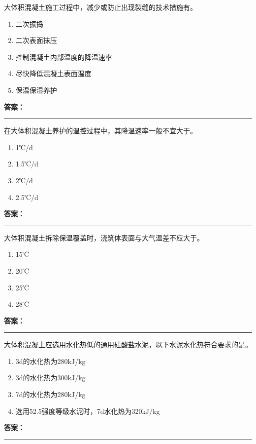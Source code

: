 \documentclass[UTF8,fontset=fandol,11pt]{ctexart}
\newcommand{\answerline}{\textcolor{answerred}{\rule{2.4cm}{0.7pt}}}
\begin{document}
\vspace{0.2em}

\begin{quizbox}[title={第 82 题}]
大体积混凝土施工过程中，减少或防止出现裂缝的技术措施有。\\
\begin{enumerate}[label=\Alph*.]
\item 二次振捣
\item 二次表面抹压
\item 控制混凝土内部温度的降温速率
\item 尽快降低混凝土表面温度
\item 保温保湿养护
\end{enumerate}
\textbf{\textcolor{answerred}{答案：}} \answerline
\end{quizbox}

\vspace{0.2em}

\begin{quizbox}[title={第 83 题}]
在大体积混凝土养护的温控过程中，其降温速率一般不宜大于。\\
\begin{enumerate}[label=\Alph*.]
\item 1℃/d
\item 1.5℃/d
\item 2℃/d
\item 2.5℃/d
\end{enumerate}
\textbf{\textcolor{answerred}{答案：}} \answerline
\end{quizbox}

\vspace{0.2em}

\begin{quizbox}[title={第 84 题}]
大体积混凝土拆除保温覆盖时，浇筑体表面与大气温差不应大于。\\
\begin{enumerate}[label=\Alph*.]
\item 15℃
\item 20℃
\item 25℃
\item 28℃
\end{enumerate}
\textbf{\textcolor{answerred}{答案：}} \answerline
\end{quizbox}

\vspace{0.2em}

\begin{quizbox}[title={第 85 题}]
大体积混凝土应选用水化热低的通用硅酸盐水泥，以下水泥水化热符合要求的是。\\
\begin{enumerate}[label=\Alph*.]
\item 3d的水化热为280kJ/kg
\item 3d的水化热为300kJ/kg
\item 7d的水化热为280kJ/kg
\item 选用52.5强度等级水泥时，7d水化热为320kJ/kg
\end{enumerate}
\textbf{\textcolor{answerred}{答案：}} \answerline
\end{quizbox}
\end{document}
